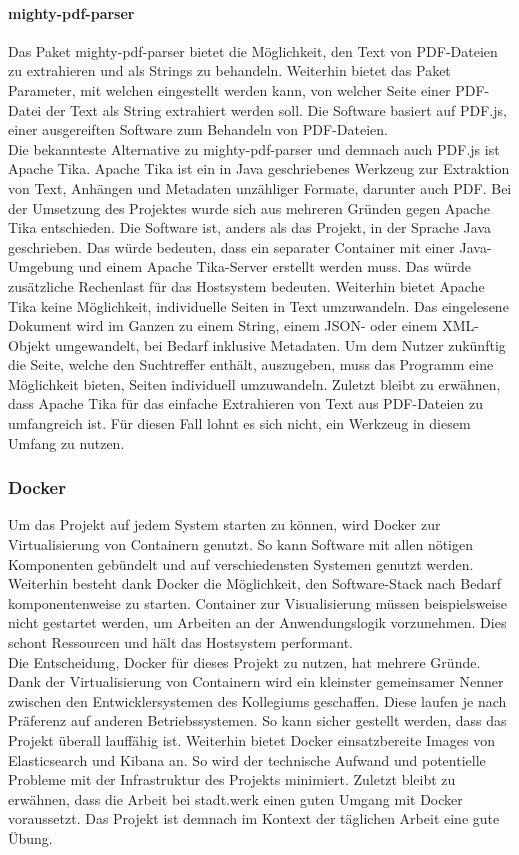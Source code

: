 \documentclass[a4paper]{scrartcl}
\begin{document}
\paragraph{mighty-pdf-parser}
Das Paket mighty-pdf-parser bietet die Möglichkeit, den Text von PDF-Dateien zu extrahieren und als Strings zu behandeln. Weiterhin bietet das Paket Parameter, mit welchen eingestellt werden kann, von welcher Seite einer PDF-Datei der Text als String extrahiert werden soll. Die Software basiert auf PDF.js, einer ausgereiften Software zum Behandeln von PDF-Dateien. \\
Die bekannteste Alternative zu mighty-pdf-parser und demnach auch PDF.js ist Apache Tika. Apache Tika ist ein in Java geschriebenes Werkzeug zur Extraktion von Text, Anhängen und Metadaten unzähliger Formate, darunter auch PDF. Bei der Umsetzung des Projektes wurde sich aus mehreren Gründen gegen Apache Tika entschieden. Die Software ist, anders als das Projekt, in der Sprache Java geschrieben. Das würde bedeuten, dass ein separater Container mit einer Java-Umgebung und einem Apache Tika-Server erstellt werden muss. Das würde zusätzliche Rechenlast für das Hostsystem bedeuten. Weiterhin bietet Apache Tika keine Möglichkeit, individuelle Seiten in Text umzuwandeln. Das eingelesene Dokument wird im Ganzen zu einem String, einem JSON- oder einem XML-Objekt umgewandelt, bei Bedarf inklusive Metadaten. Um dem Nutzer zukünftig die Seite, welche den Suchtreffer enthält, auszugeben, muss das Programm eine Möglichkeit bieten, Seiten individuell umzuwandeln. Zuletzt bleibt zu erwähnen, dass Apache Tika für das einfache Extrahieren von Text aus PDF-Dateien zu umfangreich ist. Für diesen Fall lohnt es sich nicht, ein Werkzeug in diesem Umfang zu nutzen.

\subsubsection{Docker}
Um das Projekt auf jedem System starten zu können, wird Docker zur Virtualisierung von Containern genutzt. So kann Software mit allen nötigen Komponenten gebündelt und auf verschiedensten Systemen genutzt werden. Weiterhin besteht dank Docker die Möglichkeit, den Software-Stack nach Bedarf komponentenweise zu starten. Container zur Visualisierung müssen beispielsweise nicht gestartet werden, um Arbeiten an der Anwendungslogik vorzunehmen. Dies schont Ressourcen und hält das Hostsystem performant. \\
Die Entscheidung, Docker für dieses Projekt zu nutzen, hat mehrere Gründe. Dank der Virtualisierung von Containern wird ein kleinster gemeinsamer Nenner zwischen den Entwicklersystemen des Kollegiums geschaffen. Diese laufen je nach Präferenz auf anderen Betriebssystemen. So kann sicher gestellt werden, dass das Projekt überall lauffähig ist. Weiterhin bietet Docker einsatzbereite Images von Elasticsearch und Kibana an. So wird der technische Aufwand und potentielle Probleme mit der Infrastruktur des Projekts minimiert. Zuletzt bleibt zu erwähnen, dass die Arbeit bei stadt.werk einen guten Umgang mit Docker voraussetzt. Das Projekt ist demnach im Kontext der täglichen Arbeit eine gute Übung. \\
\end{document}

